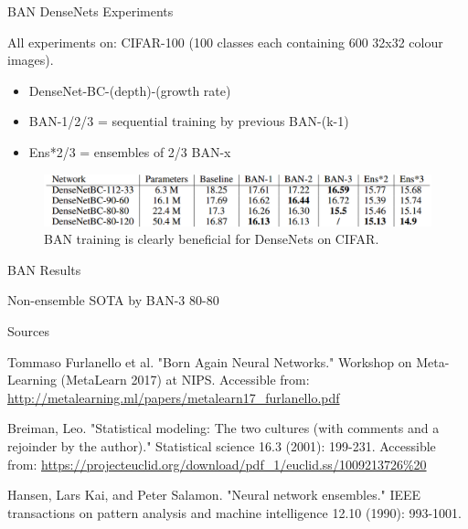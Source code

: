 \documentclass{beamer}
\begin{document}
\begin{frame}{BAN DenseNets Experiments }

All experiments on: CIFAR-100 (100 classes each containing 600 32x32 colour images).

\begin{itemize}
\item DenseNet-BC-(depth)-(growth rate)
\item BAN-1/2/3 = sequential training by previous BAN-(k-1)
\item Ens*2/3 = ensembles of 2/3 BAN-x
\end{itemize}

\begin{figure}[h]
\includegraphics[width=\textwidth]{img/denseNet_experiment}
\caption{BAN training is clearly beneficial for DenseNets on CIFAR. \cite{cit:ban}}
\end{figure}

\end{frame}
\begin{frame}{BAN Results}

Non-ensemble SOTA by BAN-3 80-80
 

\end{frame}

\begin{frame}{Sources}

\begin{thebibliography}{0}

   Tommaso Furlanello et al. "Born Again Neural Networks." Workshop on Meta-Learning (MetaLearn 2017) at NIPS. Accessible from: \url{http://metalearning.ml/papers/metalearn17_furlanello.pdf}
  
   Breiman, Leo. "Statistical modeling: The two cultures (with comments and a rejoinder by the author)." Statistical science 16.3 (2001): 199-231. Accessible from: \url{https://projecteuclid.org/download/pdf_1/euclid.ss/1009213726\%20}
  
   Hansen, Lars Kai, and Peter Salamon. "Neural network ensembles." IEEE transactions on pattern analysis and machine intelligence 12.10 (1990): 993-1001.
\end{thebibliography}

\end{frame}
\end{document}
